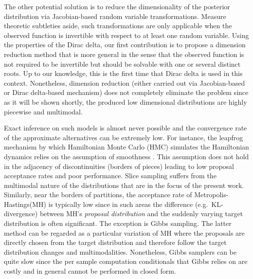 \documentclass[letterpaper]{article}
\begin{document}
The other potential solution is to reduce the dimensionality of the posterior distribution via Jacobian-based random variable transformations. Measure theoretic subtleties aside, such transformations are only applicable when the observed function is invertible with respect to at least one random variable. Using the properties of the Dirac delta, our first contribution is to propose a dimension reduction method that is more general in the sense that the observed function is not required to be invertible but should be solvable with one or several distinct roots. Up to our knowledge, this is the first time that Dirac delta is used in this context.
Nonetheless, dimension reduction (either carried out via Jacobian-based or Dirac delta-based mechanism) does not completely eliminate the problem since as it will be shown shortly, the produced low dimensional distributions are highly piecewise and multimodal. 

Exact inference on such models is almost never possible and the convergence rate of the approximate alternatives can be extremely low.
For instance,
the leapfrog mechanism by which Hamiltonian Monte Carlo (HMC) simulates the Hamiltonian dynamics relies on the assumption of smoothness \cite{neal2011mcmc}.
This assumption does not hold 
 in the adjacency of discontinuities (borders of pieces) leading to low proposal acceptance rates and poor performance. 
Slice sampling suffers from the multimodal nature of the distributions that are in the focus of  the present work. Similarly, near the borders of partitions, the acceptance rate of Metropolis-Hastings(MH) is typically low since in such areas the difference (e.g.\ KL-divergence) between MH’s \emph{proposal distribution} and the suddenly varying target distribution is often significant.
The exception is Gibbs sampling. The latter method can be regarded as a particular variation of MH where the proposals are directly chosen from the target distribution and therefore follow the target distribution changes and multimodalities.
Nonetheless, Gibbs samplers can be quite slow since the per sample computation conditionals that Gibbs relies on are costly and in general cannot be performed in closed form.    
\end{document}

